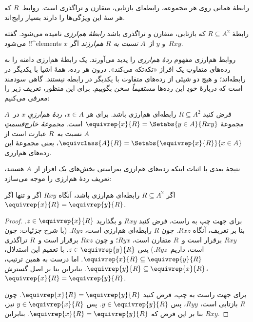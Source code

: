 \documentclass[../../../include/open-logic-section]{subfiles}
\begin{document}


رابطهٔ همانی روی هر مجموعه، رابطه‌ای بازتابی، متقارن و تراگذری است. روابط~$R$
که هر سهٔ این ویژگی‌ها را دارند بسیار رایج‌اند.

\begin{defn}
رابطهٔ $R \subseteq A^2$ که بازتابی، متقارن و تراگذری باشد
\emph{رابطهٔ هم‌ارزی} نامیده می‌شود. گفته می‌شود !!^{element}s $x$
و $y$ از~$A$ \emph{نسبت به $R$ هم‌ارزند} اگر~$Rxy$.
\end{defn}

روابط هم‌ارزی مفهوم \emph{ردهٔ هم‌ارزی} را پدید می‌آورند. یک رابطهٔ
هم‌ارزی دامنه را به رده‌های متفاوتِ یک افراز «تکه‌تکه می‌کند». درون هر
رده، همهٔ اشیا با یکدیگر در رابطه‌اند؛ و هیچ دو شیئی از رده‌های متفاوت
با یکدیگر در رابطه نیستند. گاهی سودمند است که دربارهٔ خودِ این رده‌ها
\emph{مستقیماً} سخن بگوییم. برای این منظور، تعریف زیر را معرفی می‌کنیم:

\begin{defn}
فرض کنید $R \subseteq A^2$ رابطه‌ای هم‌ارزی باشد. برای هر $x \in A$،
\emph{ردهٔ هم‌ارزیِ} $x$ در~$A$ مجموعهٔ $\equivrep{x}{R}
= \Setabs{y \in A}{Rxy}$ است. \emph{مجموعهٔ خارج‌قسمتِ} $A$ نسبت
به~$R$ عبارت است از
$\equivclass{A}{R} = \Setabs{\equivrep{x}{R}}{x \in A}$، یعنی مجموعهٔ
این رده‌های هم‌ارزی.
\end{defn}

نتیجهٔ بعدی با اثبات اینکه رده‌های هم‌ارزی به‌راستی بخش‌های یک افراز از~$A$
هستند، تعریف ردهٔ هم‌ارزی را موجه می‌سازد:

\begin{prop}
اگر $R \subseteq A^2$ رابطه‌ای هم‌ارزی باشد، آنگاه $Rxy$ اگر و تنها اگر
$\equivrep{x}{R} = \equivrep{y}{R}$.
\end{prop}

\begin{proof}
برای جهت چپ به راست، فرض کنید $Rxy$ و بگذارید $z \in
\equivrep{x}{R}$. بنا بر تعریف، آنگاه $Rxz$. چون $R$ رابطه‌ای هم‌ارزی
است، $Ryz$. (با شرح جزئیات: چون $Rxy$ برقرار است و~$R$ متقارن است، $Ryx$؛
و چون $Rxz$ برقرار است و~$R$ تراگذری است، داریم~$Ryz$.) پس
$z \in \equivrep{y}{R}$. با تعمیم
این استدلال، $\equivrep{x}{R} \subseteq \equivrep{y}{R}$. اما درست به
همین ترتیب، $\equivrep{y}{R} \subseteq \equivrep{x}{R}$. بنابراین بنا
بر اصل گسترش، $\equivrep{x}{R} =
\equivrep{y}{R}$.

برای جهت راست به چپ، فرض کنید $\equivrep{x}{R} =
\equivrep{y}{R}$. چون $R$ بازتابی است، $Ryy$، پس $y \in
\equivrep{y}{R}$. پس $y \in \equivrep{x}{R}$ نیز، بنا بر این فرض که
$\equivrep{x}{R} = \equivrep{y}{R}$. بنابراین $Rxy$.
\end{proof}
\end{document}
